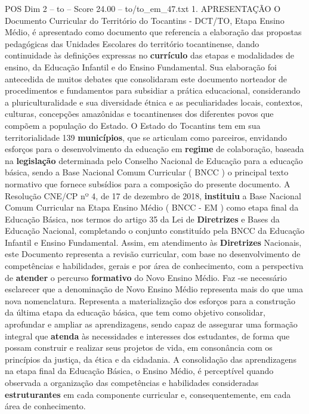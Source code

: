 \begin{textsample}{POS Dim 2 – to – Score 24.00 – to/to\_em\_47.txt}  \label{ex:f2_pos_134}
1.
APRESENTAÇÃO O Documento Curricular do Território do Tocantins - DCT/TO, Etapa Ensino Médio, é apresentado como documento que referencia a elaboração das propostas pedagógicas das Unidades Escolares do território tocantinense, dando continuidade às definições expressas no \textbf{currículo} das etapas e modalidades de ensino, da Educação Infantil e do Ensino Fundamental.
Sua elaboração foi antecedida de muitos debates que consolidaram este documento norteador de procedimentos e fundamentos para subsidiar a prática educacional, considerando a pluriculturalidade e sua diversidade étnica e as peculiaridades locais, contextos, culturas, concepções amazônidas e tocantinenses dos diferentes povos que compõem a população do Estado.
O Estado do Tocantins tem em sua territorialidade 139 \textbf{municípios}, que se articulam como parceiros, envidando esforços para o desenvolvimento da educação em \textbf{regime} de colaboração, baseada na \textbf{legislação} determinada pelo Conselho Nacional de Educação para a educação básica, sendo a Base Nacional Comum Curricular ( BNCC ) o principal texto normativo que fornece subsídios para a composição do presente documento.
A Resolução CNE/CP nº 4, de 17 de dezembro de 2018, \textbf{instituiu} a Base Nacional Comum Curricular na Etapa Ensino Médio ( BNCC - EM ) como etapa final da Educação Básica, nos termos do artigo 35 da Lei de \textbf{Diretrizes} e Bases da Educação Nacional, completando o conjunto constituído pela BNCC da Educação Infantil e Ensino Fundamental.
Assim, em atendimento às \textbf{Diretrizes} Nacionais, este Documento representa a revisão curricular, com base no desenvolvimento de competências e habilidades, gerais e por área de conhecimento, com a perspectiva de \textbf{atender} o percurso \textbf{formativo} do Novo Ensino Médio.
Faz -se necessário esclarecer que a denominação de Novo Ensino Médio representa mais do que uma nova nomenclatura.
Representa a materialização dos esforços para a construção da última etapa da educação básica, que tem como objetivo consolidar, aprofundar e ampliar as aprendizagens, sendo capaz de assegurar uma formação integral que \textbf{atenda} às necessidades e interesses dos estudantes, de forma que possam construir e realizar seus projetos de vida, em consonância com os princípios da justiça, da ética e da cidadania.
A consolidação das aprendizagens na etapa final da Educação Básica, o Ensino Médio, é perceptível quando observada a organização das competências e habilidades consideradas \textbf{estruturantes} em cada componente curricular e, consequentemente, em cada área de conhecimento.

\end{textsample}
